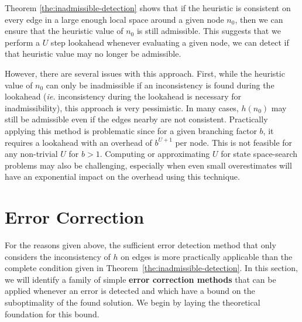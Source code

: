 \documentclass[letterpaper]{article}
\begin{document}
Theorem \ref{the:inadmissible-detection} shows that if the heuristic is consistent on every edge in a large enough local space around a given node $n_0$, then we can ensure that the heuristic value of $n_0$ is still admissible. This suggests that we perform a $U$ step lookahead whenever evaluating a given node, we can detect if that heuristic value may no longer be admissible.

However, there are several issues with this approach. First, while the heuristic value of $n_0$ can only be inadmissible if an inconsistency is found during the lookahead (\textit{ie.} inconsistency during the lookahead is necessary for inadmissibility), this approach is very pessimistic. In many cases, $h(n_0)$ may still be admissible even if the edges nearby are not consistent. Practically applying this method is problematic since for a given branching factor $b$, it requires a lookahead with an overhead of $b^{U+1}$ per node. This is not feasible for any non-trivial $U$ for $b>1$. Computing or approximating $U$ for state space-search problems may also be challenging, especially when even small overestimates will have an exponential impact on the overhead using this technique. 



\section{Error Correction}
For the reasons given above, the sufficient error detection method that only considers the inconsistency of $h$ on edges is more practically applicable than the complete condition given in Theorem~\ref{the:inadmissible-detection}. 
In this section, we will identify a family of simple \textbf{error correction methods} that can be applied whenever an error is detected and which have a bound on the suboptimality of the found solution.
We begin by laying the theoretical foundation for this bound.
\end{document}
